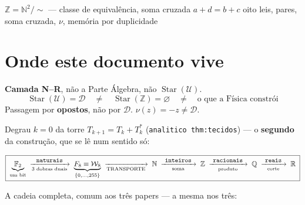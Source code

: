 \documentclass[11pt,a4paper]{article}
\newcommand{\code}[1]{\texttt{\small #1}}
\newcommand{\FF}{\mathbb{F}}
\newcommand{\Word}{\mathcal{W}}
\begin{document}
       {$\mathbb{Z}=\mathbb{N}^{2}/{\sim}$ --- classe de equivalência,
        soma cruzada $a+d=b+c$}
       {oito leis, pares, soma cruzada, $\nu$, memória por duplicidade}
\maketitle

\begin{abstract}
Degrau $k{=}0$ da torre (\code{analitico thm:tecidos}): construção dual
$T+T^{*}$ --- $\mathbb{N}^{2}/{\sim}$ com $(a,b)\sim(c,d)\iff a+d=b+c$.
O inteiro é a \textbf{classe} $[(a,b)]$; $\Phi([(a,b)])=a-b$.
\end{abstract}

\section*{Onde este documento vive}

\noindent\textbf{Camada N--R}, não a Parte Álgebra, não \(\operatorname{Star}(\mathcal{U})\).
\[
\boxed{\;
\operatorname{Star}(\mathcal{U})=\mathcal{D}
\quad\neq\quad
\operatorname{Star}(\mathbb{Z})=\varnothing
\quad\neq\quad
\text{o que a Física constrói}
\;}
\]
Passagem por \textbf{opostos}, não por \(\mathcal{D}\). \(\nu(z)=-z\neq\mathcal{D}\).

Degrau $k=0$ da torre $T_{k+1}=T_k+T_k^{*}$
(\code{analitico thm:tecidos}) --- o \textbf{segundo} da construção, que se lê
num sentido só:

\[
\boxed{\;
\underbrace{\FF_2}_{\text{um bit}}
\;\xrightarrow[\text{3 dobras duais}]{\ \code{naturais}\ }\;
\underbrace{F_8\equiv\Word_8}_{\{0,\ldots,255\}}
\;\xrightarrow[\text{TRANSPORTE}]{}\;
\mathbb{N}
\;\xrightarrow[\text{soma}]{\ \code{inteiros}\ }\;
\mathbb{Z}
\;\xrightarrow[\text{produto}]{\ \code{racionais}\ }\;
\mathbb{Q}
\;\xrightarrow[\text{corte}]{\ \code{reais}\ }\;
\mathbb{R}\;}
\]

\noindent A cadeia completa, comum aos três papers
--- a mesma nos três:
\end{document}
